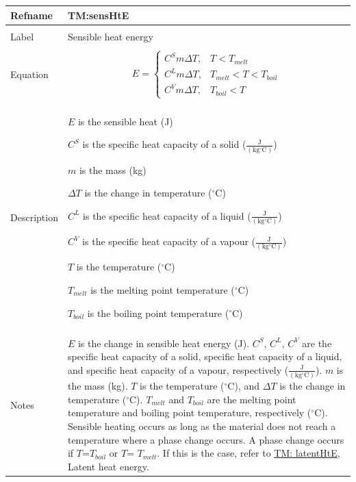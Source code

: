 \documentclass[12pt]{article}
\begin{document}
\noindent \begin{minipage}{\textwidth}
\begin{tabular}{>{\raggedright}p{}>{\raggedright\arraybackslash}p{}}
\toprule \textbf{Refname} & \textbf{TM:sensHtE}
\label{TM:sensHtE}
\\ \midrule \\
Label & Sensible heat energy
\\ \midrule \\
Equation & \begin{displaymath}
           E=\begin{cases}
{C^{S}} m ΔT, & T<{T_{melt}}\\
{C^{L}} m ΔT, & {T_{melt}}<T<{T_{boil}}\\
{C^{V}} m ΔT, & {T_{boil}}<T
\end{cases}
           \end{displaymath}
\\ \midrule \\
Description & \begin{symbDescription}
              \item{$E$ is the sensible heat (J)}
              \item{${C^{S}}$ is the specific heat capacity of a solid ($\frac{\text{J}}{(\text{kg}{}^{\circ}\text{C})}$)}
              \item{$m$ is the mass (kg)}
              \item{$ΔT$ is the change in temperature (${}^{\circ}$C)}
              \item{${C^{L}}$ is the specific heat capacity of a liquid ($\frac{\text{J}}{(\text{kg}{}^{\circ}\text{C})}$)}
              \item{${C^{V}}$ is the specific heat capacity of a vapour ($\frac{\text{J}}{(\text{kg}{}^{\circ}\text{C})}$)}
              \item{$T$ is the temperature (${}^{\circ}$C)}
              \item{${T_{melt}}$ is the melting point temperature (${}^{\circ}$C)}
              \item{${T_{boil}}$ is the boiling point temperature (${}^{\circ}$C)}
              \end{symbDescription}
\\ \midrule \\
Notes & $E$ is the change in sensible heat energy (J). ${C^{S}}$, ${C^{L}}$, ${C^{V}}$ are the specific heat capacity of a solid, specific heat capacity of a liquid, and specific heat capacity of a vapour, respectively ($\frac{\text{J}}{(\text{kg}{}^{\circ}\text{C})}$). $m$ is the mass (kg). $T$ is the temperature (${}^{\circ}$C), and $ΔT$ is the change in temperature (${}^{\circ}$C). ${T_{melt}}$ and ${T_{boil}}$ are the melting point temperature and boiling point temperature, respectively (${}^{\circ}$C). Sensible heating occurs as long as the material does not reach a temperature where a phase change occurs. A phase change occurs if $T$=${T_{boil}}$ or $T$= ${T_{melt}}$. If this is the case, refer to \hyperref[TM:latentHtE]{TM: latentHtE}, Latent heat energy.

\end{tabular}
\end{minipage}
\end{document}
